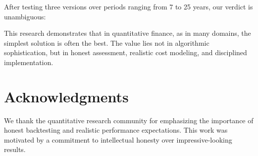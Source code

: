 \documentclass[twocolumn,ieee]{arithmaxresearch}
\begin{document}
After testing three versions over periods ranging from 7 to 25 years, our verdict is unambiguous:

\begin{center}
\end{center}

This research demonstrates that in quantitative finance, as in many domains, the simplest solution is often the best. The value lies not in algorithmic sophistication, but in honest assessment, realistic cost modeling, and disciplined implementation.

\section*{Acknowledgments}

We thank the quantitative research community for emphasizing the importance of honest backtesting and realistic performance expectations. This work was motivated by a commitment to intellectual honesty over impressive-looking results.
\end{document}
